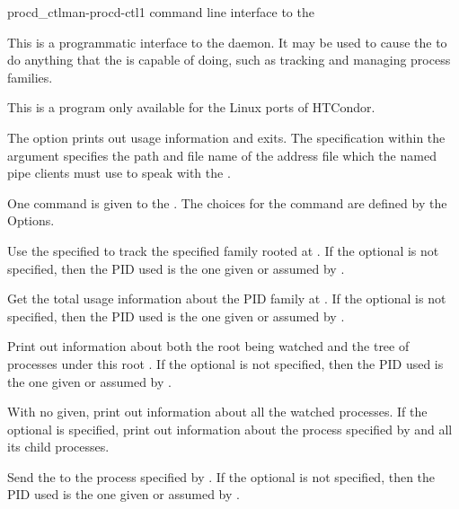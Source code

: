 \begin{ManPage}{procd\_ctl}{man-procd-ctl}{1}
{command line interface to the }

\Synopsis {} 


\Description 

This is a programmatic interface to the  daemon. 
It may be used to 
cause the  to do anything that the 
is capable of doing,
such as tracking and managing process families.

This is a program only available for the Linux ports of HTCondor.

The  option prints out usage information and exits.
The   specification within the  argument
specifies the path and file name of the address file
which the named pipe clients must use to speak with the .

One command is given to the . 
The choices for the command are defined by the Options. 

\begin{Options}

  {Use the specified  to track the specified family rooted at 
  .  
  If the optional  is not specified, 
  then the PID used is the one given or assumed by .}

  {Get the total usage information about the PID family at .
  If the optional  is not specified, 
  then the PID used is the one given or assumed by .}

  {Print out information about both the root  being watched 
  and the tree of processes under this root .
  If the optional  is not specified, 
  then the PID used is the one given or assumed by .}

  {With no  given, print out information about all 
  the watched processes.  
  If the optional  is specified,
  print out information about the process specified by  
  and all its child processes.}

  {Send the  to the process specified by .
  If the optional  is not specified, 
  then the PID used is the one given or assumed by .}


\end{Options}
\end{ManPage}
